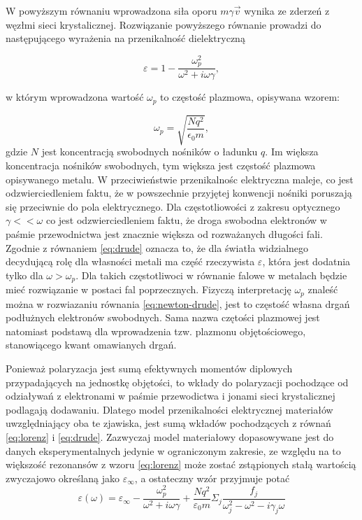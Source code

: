 W powyższym równaniu wprowadzona siła oporu $m \gamma \vec{v}$ wynika ze zderzeń z węzłmi sieci krystalicznej. Rozwiązanie powyższego równanie prowadzi do następującego wyrażenia na przenikalność dielektryczną

\begin{equation}
\varepsilon= 1 - \frac{\omega_p^2}{\omega^2+i\omega \gamma},
\label{eq:drude}
\end{equation}

w którym wprowadzona wartość $\omega_p$ to częstość plazmowa, opisywana wzorem:

\begin{equation}
\omega_p = \sqrt{\frac{N q^2}{\epsilon_0 m}},
\label{eq:omega-plazmowa}
\end{equation}
gdzie $N$ jest koncentracją swobodnych nośników o ładunku $q$. Im większa koncentracja nośników swobodnych, tym większa jest częstość plazmowa opisywanego metalu. W przeciwieństwie przenikalnośc elektryczna maleje, co jest odzwierciedleniem faktu, że w powszechnie przyjętej konwencji nośniki poruszają się przeciwnie do pola elektrycznego. Dla częstotliowości z zakresu optycznego $\gamma<<\omega$ co jest odzwierciedleniem faktu, że droga swobodna elektronów w paśmie przewodnictwa jest znacznie większa od rozważanych długości fali. Zgodnie z równaniem  \ref{eq:drude} oznacza to, że dla światła widzialnego decydującą rolę dla własności metali ma część rzeczywista $\varepsilon$, która jest dodatnia tylko dla $\omega>\omega_p$. Dla takich częstotliwoci w równanie falowe w metalach będzie mieć rozwiązanie w postaci fal poprzecznych. Fizyczą interpretację $\omega_p$ znaleść można w rozwiazaniu równania \ref{eq:newton-drude}, jest to częstość własna drgań podłużnych elektronów swobodnych. Sama nazwa czętości plazmowej jest natomiast podstawą dla wprowadzenia tzw. plazmonu objętościowego, stanowiącego kwant omawianych drgań.

Ponieważ polaryzacja jest sumą efektywnych momentów diplowych przypadających na jednostkę objętości, to wkłady do polaryzacji pochodzące od odziaływań z elektronami w paśmie przewodictwa i jonami sieci krystalicznej podlagają dodawaniu. Dlatego model przenikalności elektrycznej materiałów uwzględniający oba te zjawiska, jest sumą wkładów pochodzących z równań \ref{eq:lorenz} i \ref{eq:drude}. Zazwyczaj model materiałowy dopasowywane jest do danych eksperymentalnych jedynie w ograniczonym zakresie, ze względu na to większość rezonansów z wzoru \ref{eq:lorenz} może zostać zstąpionych stałą wartością zwyczajowo określaną jako $\varepsilon_\infty$, a ostateczny wzór przyjmuje potać
\begin{equation}
\varepsilon(\omega)=\varepsilon_\infty- \frac{\omega_p^2}{\omega^2+i\omega\gamma} +\frac{Nq^2}{\varepsilon_0 m} \Sigma_j \frac{f_j}{\omega_j^2-\omega^2-i\gamma_j\omega}
\label{eq:lorenz-drude}
\end{equation}

